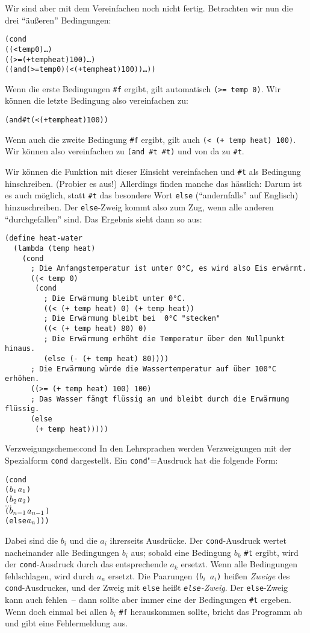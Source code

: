Wir sind aber mit dem Vereinfachen noch nicht fertig. Betrachten wir
nun die drei "`äußeren"' Bedingungen:
%
\begin{alltt}
    (cond
      ((< temp 0) \ldots)
      ((>= (+ temp heat) 100) \ldots)
      ((and (>= temp 0) (< (+ temp heat) 100)) \ldots))
\end{alltt}
%
Wenn die erste Bedingungen \verb|#f| ergibt, gilt automatisch
\texttt{(>= temp 0)}.  Wir können die letzte Bedingung also
vereinfachen zu:
%
\begin{alltt}
(and #t (< (+ temp heat) 100))
\end{alltt}
%
Wenn auch die zweite Bedingung \verb|#f| ergibt, gilt auch \texttt{(<
  (+ temp heat) 100)}.  Wir können also vereinfachen zu \texttt{(and
  \#t \#t)} und von da zu \verb|#t|.

Wir können die Funktion mit dieser Einsicht vereinfachen und \verb|#t|
als Bedingung hinschreiben.  (Probier es aus!)  Allerdings finden
manche das hässlich: Darum ist es auch möglich, statt \verb|#t| das
besondere Wort \texttt{else}
("`andernfalls"' auf Englisch) hinzuschreiben.
Der \texttt{else}-Zweig kommt also zum Zug, wenn alle anderen
"`durchgefallen"' sind.  Das Ergebnis sieht
dann so aus:
%
\begin{verbatim}
(define heat-water
  (lambda (temp heat)
    (cond
      ; Die Anfangstemperatur ist unter 0°C, es wird also Eis erwärmt.
      ((< temp 0)
       (cond
         ; Die Erwärmumg bleibt unter 0°C.
         ((< (+ temp heat) 0) (+ temp heat))
         ; Die Erwärmung bleibt bei  0°C "stecken"
         ((< (+ temp heat) 80) 0)
         ; Die Erwärmung erhöht die Temperatur über den Nullpunkt hinaus.
         (else (- (+ temp heat) 80))))
      ; Die Erwärmung würde die Wassertemperatur auf über 100°C erhöhen.
      ((>= (+ temp heat) 100) 100)
      ; Das Wasser fängt flüssig an und bleibt durch die Erwärmung flüssig.
      (else
       (+ temp heat)))))
\end{verbatim}
%
\begin{feature}{Verzweigung}{scheme:cond}
In den Lehrsprachen werden Verzweigungen
mit der Spezialform \texttt{cond} dargestellt.
Ein \texttt{cond}"=Ausdruck hat die folgende Form:
%
\begin{alltt}
(cond
  (\(b\sb{1}\) \(a\sb{1}\))
  (\(b\sb{2}\) \(a\sb{2}\))
  \(\ldots\)
  (\(b\sb{n-1}\) \(a\sb{n-1}\))
  (else \(a\sb{n}\))))
\end{alltt}
%
Dabei sind die $b_i$ und die $a_i$ ihrerseits Ausdrücke.  Der
\texttt{cond}-Ausdruck wertet nacheinander alle Bedingungen $b_i$ aus;
sobald eine Bedingung $b_k$ \texttt{\#t} ergibt, wird der
\texttt{cond}-Ausdruck durch das entsprechende $a_k$ ersetzt.  Wenn
alle Bedingungen fehlschlagen, wird durch $a_n$ ersetzt.  Die Paarungen
\texttt{($b_i$ $a_i$)} heißen \textit{Zweige} des
\texttt{cond}-Ausdruckes, und der Zweig mit \texttt{else}  heißt
\textit{\texttt{else}-Zweig}.
Der \texttt{else}-Zweig kann auch fehlen~-- dann sollte aber immer
eine der Bedingungen  \texttt{\#t} ergeben.  Wenn doch einmal bei allen
$b_i$ \verb|#f| herauskommen sollte, bricht \drscheme{} das Programm ab
und gibt eine Fehlermeldung aus.
\end{feature}
